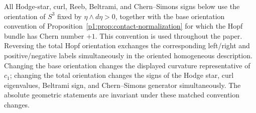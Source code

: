\documentclass[11pt]{article}
\begin{document}
\begin{convention}
\label{p1:conv:global-orientation-signs}
All Hodge-star, curl, Reeb, Beltrami, and Chern--Simons signs below use the
orientation of $S^3$ fixed by $\eta\wedge d\eta>0$, together with the base
orientation convention of Proposition~\ref{p1:prop:contact-normalization} for which the Hopf bundle has Chern number $+1$.
This convention is used throughout the paper.  Reversing the total Hopf orientation exchanges the corresponding left/right and positive/negative labels simultaneously in the oriented homogeneous description.
Changing the base orientation changes the displayed curvature representative of
$c_1$; changing the total orientation changes the signs of the Hodge star, curl
eigenvalues, Beltrami sign, and Chern--Simons generator simultaneously.  The
absolute geometric statements are invariant under these matched convention
changes.
\end{convention}
\end{document}
